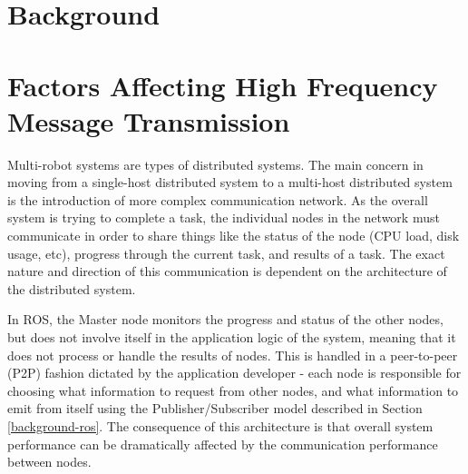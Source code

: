 \documentclass{l4proj}
\begin{document}

\chapter{Background}
\label{background-chapter}









\chapter{Factors Affecting High Frequency Message Transmission}
\label{communication-chapter}

Multi-robot systems are types of distributed systems. The main concern in moving from a single-host distributed system to a multi-host distributed system is the introduction of more complex communication network. As the overall system is trying to complete a task, the individual nodes in the network must communicate in order to share things like the status of the node (CPU load, disk usage, etc), progress through the current task, and results of a task. The exact nature and direction of this communication is dependent on the architecture of the distributed system.

In ROS, the Master node monitors the progress and status of the other nodes, but does not involve itself in the application logic of the system, meaning that it does not process or handle the results of nodes. This is handled in a peer-to-peer (P2P) fashion dictated by the application developer - each node is responsible for choosing what information to request from other nodes, and what information to emit from itself using the Publisher/Subscriber model described in Section \ref{background-ros}. The consequence of this architecture is that overall system performance can be dramatically affected by the communication performance between nodes.
\end{document}

